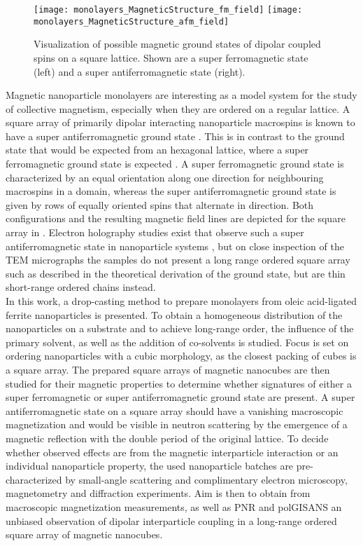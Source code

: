 \documentclass[\main/dresen_thesis.tex]{subfiles}
\begin{document}
  \begin{figure}[tb]
    \centering
    \texttt{[image: monolayers\_MagneticStructure\_fm\_field]}
    \texttt{[image: monolayers\_MagneticStructure\_afm\_field]}
    \caption{\label{fig:monolayers:intro:magneticStateSquareArray}Visualization of possible magnetic ground states of dipolar coupled spins on a square lattice. Shown are a super ferromagnetic state (left) and a super antiferromagnetic state (right).}
  \end{figure}
  Magnetic nanoparticle monolayers are interesting as a model system for the study of collective magnetism, especially when they are ordered on a regular lattice.
  A square array of primarily dipolar interacting nanoparticle macrospins is known to have a super antiferromagnetic ground state \cite{Russier_2001_Calcu}.
  This is in contrast to the ground state that would be expected from an hexagonal lattice, where a super ferromagnetic ground state is expected \cite{Russier_2001_Calcu}.
  A super ferromagnetic ground state is characterized by an equal orientation along one direction for neighbouring macrospins in a domain, whereas the super antiferromagnetic ground state is given by rows of equally oriented spins that alternate in direction.
  Both configurations and the resulting magnetic field lines are depicted for the square array in .
  Electron holography studies exist that observe such a super antiferromagnetic state in nanoparticle systems \cite{Varon_2013_Dipol}, but on close inspection of the TEM micrographs the samples do not present a long range ordered square array such as described in the theoretical derivation of the ground state, but are thin short-range ordered chains instead.
  \\

  In this work, a drop-casting method to prepare monolayers from oleic acid-ligated ferrite nanoparticles is presented.
  To obtain a homogeneous distribution of the nanoparticles on a substrate and to achieve long-range order, the influence of the primary solvent, as well as the addition of co-solvents is studied.
  Focus is set on ordering nanoparticles with a cubic morphology, as the closest packing of cubes is a square array.
  The prepared square arrays of magnetic nanocubes are then studied for their magnetic properties to determine whether signatures of either a super ferromagnetic or super antiferromagnetic ground state are present.
  A super antiferromagnetic state on a square array should have a vanishing macroscopic magnetization and would be visible in neutron scattering by the emergence of a magnetic reflection with the double period of the original lattice.
  To decide whether observed effects are from the magnetic interparticle interaction or an individual nanoparticle property, the used nanoparticle batches are pre-characterized by small-angle scattering and complimentary electron microscopy, magnetometry and diffraction experiments.
  Aim is then to obtain from macroscopic magnetization measurements, as well as PNR and polGISANS an unbiased observation of dipolar interparticle coupling in a long-range ordered square array of magnetic nanocubes.
\end{document}

